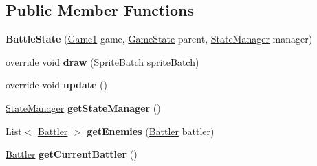\subsection*{Public Member Functions}
\begin{DoxyCompactItemize}
\item 
\hypertarget{class_simple_r_p_g_1_1_states_1_1_battle_state_a6f6ee41b383c1e50137ad9e3fbbdfcbe}{{\bfseries Battle\+State} (\hyperlink{class_simple_r_p_g_1_1_game1}{Game1} game, \hyperlink{class_simple_r_p_g_1_1_states_1_1_game_state}{Game\+State} parent, \hyperlink{class_simple_r_p_g_1_1_states_1_1_state_manager}{State\+Manager} manager)}\label{class_simple_r_p_g_1_1_states_1_1_battle_state_a6f6ee41b383c1e50137ad9e3fbbdfcbe}

\item 
\hypertarget{class_simple_r_p_g_1_1_states_1_1_battle_state_aea4acbb5ef3605fa73f59840d3f64d85}{override void {\bfseries draw} (Sprite\+Batch sprite\+Batch)}\label{class_simple_r_p_g_1_1_states_1_1_battle_state_aea4acbb5ef3605fa73f59840d3f64d85}

\item 
\hypertarget{class_simple_r_p_g_1_1_states_1_1_battle_state_ab34b5df3fa137fb63111568eb9fd6382}{override void {\bfseries update} ()}\label{class_simple_r_p_g_1_1_states_1_1_battle_state_ab34b5df3fa137fb63111568eb9fd6382}

\item 
\hypertarget{class_simple_r_p_g_1_1_states_1_1_battle_state_a71de4d97035523217f827c4dbbedb36e}{\hyperlink{class_simple_r_p_g_1_1_states_1_1_state_manager}{State\+Manager} {\bfseries get\+State\+Manager} ()}\label{class_simple_r_p_g_1_1_states_1_1_battle_state_a71de4d97035523217f827c4dbbedb36e}

\item 
\hypertarget{class_simple_r_p_g_1_1_states_1_1_battle_state_a82c6a6de5de52d9586364607bb61d777}{List$<$ \hyperlink{class_simple_r_p_g_1_1_battler}{Battler} $>$ {\bfseries get\+Enemies} (\hyperlink{class_simple_r_p_g_1_1_battler}{Battler} battler)}\label{class_simple_r_p_g_1_1_states_1_1_battle_state_a82c6a6de5de52d9586364607bb61d777}

\item 
\hypertarget{class_simple_r_p_g_1_1_states_1_1_battle_state_afea1b2b46a818c024abe7420daae1892}{\hyperlink{class_simple_r_p_g_1_1_battler}{Battler} {\bfseries get\+Current\+Battler} ()}\label{class_simple_r_p_g_1_1_states_1_1_battle_state_afea1b2b46a818c024abe7420daae1892}

\end{DoxyCompactItemize}
